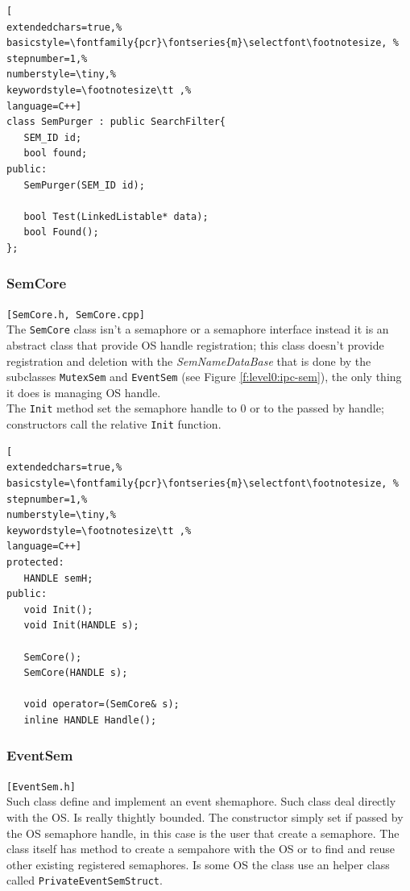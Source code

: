 \begin{lstlisting}[
extendedchars=true,%
basicstyle=\fontfamily{pcr}\fontseries{m}\selectfont\footnotesize, %
stepnumber=1,%
numberstyle=\tiny,%
keywordstyle=\footnotesize\tt ,%
language=C++]
class SemPurger : public SearchFilter{
   SEM_ID id;
   bool found;
public:
   SemPurger(SEM_ID id);

   bool Test(LinkedListable* data);
   bool Found();
};
\end{lstlisting}



\subsubsection{SemCore}
\texttt{[SemCore.h, SemCore.cpp]}\\
The \texttt{SemCore} class isn't a semaphore or a semaphore interface instead it is an abstract class that provide OS handle registration; this class doesn't provide registration and deletion with the \textit{SemNameDataBase} that is done by the subclasses \texttt{MutexSem} and \texttt{EventSem} (see Figure \ref{f:level0:ipc-sem}), the only thing it does is managing OS handle. \\


The \texttt{Init} method set the semaphore handle to 0 or to the passed by handle; constructors call the relative \texttt{Init} function.

\begin{lstlisting}[
extendedchars=true,%
basicstyle=\fontfamily{pcr}\fontseries{m}\selectfont\footnotesize, %
stepnumber=1,%
numberstyle=\tiny,%
keywordstyle=\footnotesize\tt ,%
language=C++]
protected:
   HANDLE semH;
public:
   void Init();
   void Init(HANDLE s);

   SemCore();
   SemCore(HANDLE s);

   void operator=(SemCore& s);
   inline HANDLE Handle();
\end{lstlisting}



\subsubsection{EventSem}
\texttt{[EventSem.h]}\\
Such class define and implement an event shemaphore. Such class deal directly with the OS. Is really thightly bounded. The constructor simply set if passed by the OS semaphore handle, in this case is the user that create a semaphore. The class itself has method to create a sempahore with the OS or to find and reuse other existing registered semaphores. Is some OS the class use an helper class called \texttt{PrivateEventSemStruct}.

